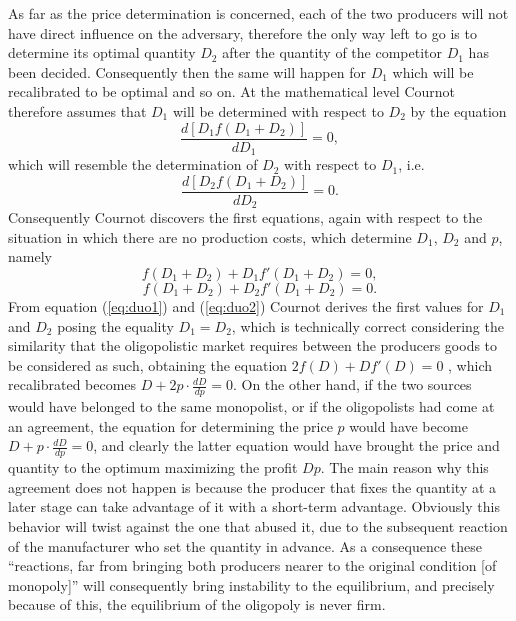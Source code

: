\documentclass[12pt]{article}
\numberwithin{equation}{subsection}
\begin{document}
As far as the price determination is concerned, each of the two producers will not have direct influence on the adversary, therefore the only way left to go is to determine its optimal quantity $D_2$ after the quantity of the competitor $D_1$ has been decided. Consequently then the same will happen for $D_1$ which will be recalibrated to be optimal and so on. At the mathematical level Cournot therefore assumes that $D_1$ will be determined with respect to $D_2$ by the equation \citep[p. 80]{cournot1897researches} \begin{equation*}
\frac{d \left[D_1f(D_1 + D_2)\right]}{dD_1} = 0,
\end{equation*} which will resemble the determination of $D_2$ with respect to $D_1$, i.e. \begin{equation*}
\frac{d \left[D_2f(D_1 + D_2)\right]}{dD_2} = 0.
\end{equation*} Consequently Cournot discovers the first equations, again with respect to the situation in which there are no production costs, which determine $D_1$, $D_2$ and $p$, namely \citep[p. 81]{cournot1897researches} \begin{equation}
\label{eq:duo1}
f(D_1 + D_2) + D_1f'(D_1 + D_2) = 0,
\end{equation} \begin{equation}
\label{eq:duo2}
f(D_1 + D_2) + D_2f'(D_1 + D_2) = 0.
\end{equation} From equation (\ref{eq:duo1}) and (\ref{eq:duo2}) Cournot derives the first values for $D_1$ and $D_2$ posing the equality $D_1 = D_2$, which is technically correct considering the similarity that the oligopolistic market requires between the producers goods to be considered as such, obtaining the equation $2f(D)+Df'(D)=0$ \citep[p. 82]{cournot1897researches}, which recalibrated becomes $D + 2p \cdot \frac{dD}{dp} = 0$. On the other hand, if the two sources would have belonged to the same monopolist, or if the oligopolists had come at an agreement, the equation for determining the price $p$ would have become $D + p \cdot \frac{dD}{dp} = 0$, and clearly the latter equation would have brought the price and quantity to the optimum maximizing the profit $Dp$. The main reason why this agreement does not happen is because the producer that fixes the quantity at a later stage can take advantage of it with a short-term advantage. Obviously this behavior will twist against the one that abused it, due to the subsequent reaction of the manufacturer who set the quantity in advance. As a consequence these ``reactions, far from bringing both producers nearer to the original condition [of monopoly]'' \cite[p. 83]{cournot1897researches} will consequently bring instability to the equilibrium, and precisely because of this, the equilibrium of the oligopoly is never firm.
\end{document}
